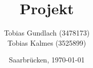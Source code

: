 \begin{titlepage}

	\titlehead
	{
		\texttt{[image: images/logos/HTW]}		
		\hfill
		\texttt{[image: images/logos/android\_green]}		
	}
	
	\subject
	{
		\Huge Dokumentation\\
		\normalsize Mobile Computing\\
	}
	
	\title
	{
		Projekt
	}
	
	\author
	{	
		Tobias Gundlach (3478173)\\
		Tobias Kalmes (3525899)
	}
	
	\date
	{
		\normalsize{Saarbrücken, \today}
	}	
	\maketitle	
\end{titlepage}

